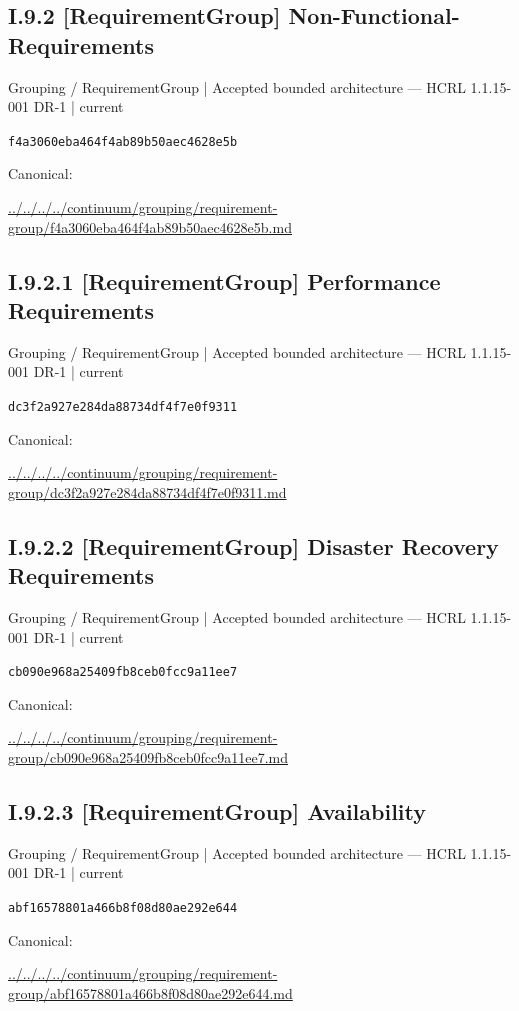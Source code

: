 \documentclass[10pt,a4paper]{article}
\begin{document}
\subsection*{I.9.2 [RequirementGroup] Non-Functional-Requirements}
\label{element-f4a3060eba464f4ab89b50aec4628e5b}
{\small Grouping / RequirementGroup | Accepted bounded architecture — HCRL 1.1.15-001 DR-1 | current}\par
\texttt{f4a3060eba464f4ab89b50aec4628e5b}\par
Canonical: \par
{\footnotesize\url{../../../../continuum/grouping/requirement-group/f4a3060eba464f4ab89b50aec4628e5b.md}}\par
\subsection*{I.9.2.1 [RequirementGroup] Performance Requirements}
\label{element-dc3f2a927e284da88734df4f7e0f9311}
{\small Grouping / RequirementGroup | Accepted bounded architecture — HCRL 1.1.15-001 DR-1 | current}\par
\texttt{dc3f2a927e284da88734df4f7e0f9311}\par
Canonical: \par
{\footnotesize\url{../../../../continuum/grouping/requirement-group/dc3f2a927e284da88734df4f7e0f9311.md}}\par
\subsection*{I.9.2.2 [RequirementGroup] Disaster Recovery Requirements}
\label{element-cb090e968a25409fb8ceb0fcc9a11ee7}
{\small Grouping / RequirementGroup | Accepted bounded architecture — HCRL 1.1.15-001 DR-1 | current}\par
\texttt{cb090e968a25409fb8ceb0fcc9a11ee7}\par
Canonical: \par
{\footnotesize\url{../../../../continuum/grouping/requirement-group/cb090e968a25409fb8ceb0fcc9a11ee7.md}}\par
\subsection*{I.9.2.3 [RequirementGroup] Availability}
\label{element-abf16578801a466b8f08d80ae292e644}
{\small Grouping / RequirementGroup | Accepted bounded architecture — HCRL 1.1.15-001 DR-1 | current}\par
\texttt{abf16578801a466b8f08d80ae292e644}\par
Canonical: \par
{\footnotesize\url{../../../../continuum/grouping/requirement-group/abf16578801a466b8f08d80ae292e644.md}}\par
\end{document}
